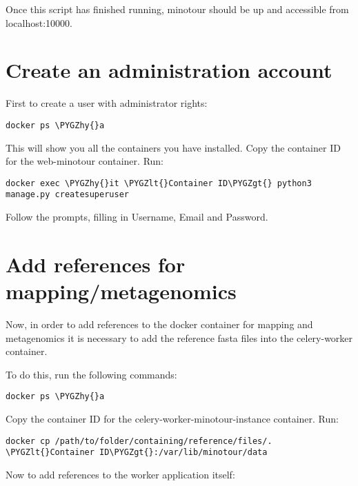 \documentclass[letterpaper,10pt,english]{sphinxmanual}
\def\PYGZlt{\char`\<}
\def\PYGZgt{\char`\>}
\def\PYGZhy{\char`\-}
\begin{document}
Once this script has finished running, minotour should be up and accessible from localhost:10000.


\section{Create an administration account}
\label{docker:create-an-administration-account}
First to create a user with administrator rights:

\begin{Verbatim}[commandchars=\\\{\}]
docker ps \PYGZhy{}a
\end{Verbatim}

This will show you all the containers you have installed. Copy the container ID for the web-minotour container. Run:

\begin{Verbatim}[commandchars=\\\{\}]
docker exec \PYGZhy{}it \PYGZlt{}Container ID\PYGZgt{} python3 manage.py createsuperuser
\end{Verbatim}

Follow the prompts, filling in Username, Email and Password.


\section{Add references for mapping/metagenomics}
\label{docker:add-references-for-mapping-metagenomics}
Now, in order to add references to the docker container for mapping and metagenomics it is necessary to add the reference fasta files into the celery-worker container.

To do this, run the following commands:

\begin{Verbatim}[commandchars=\\\{\}]
docker ps \PYGZhy{}a
\end{Verbatim}

Copy the container ID for the celery-worker-minotour-instance container. Run:

\begin{Verbatim}[commandchars=\\\{\}]
docker cp /path/to/folder/containing/reference/files/. \PYGZlt{}Container ID\PYGZgt{}:/var/lib/minotour/data
\end{Verbatim}

Now to add references to the worker application itself:
\end{document}
